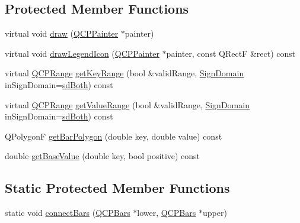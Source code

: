 \subsection*{Protected Member Functions}
\begin{DoxyCompactItemize}
\item 
virtual void \hyperlink{class_q_c_p_bars_a42b894e34dac799f90ff3700706b31df}{draw} (\hyperlink{class_q_c_p_painter}{Q\-C\-P\-Painter} $\ast$painter)
\item 
virtual void \hyperlink{class_q_c_p_bars_ad4fb35d2ab7d2aa460a6612aff3e7a15}{draw\-Legend\-Icon} (\hyperlink{class_q_c_p_painter}{Q\-C\-P\-Painter} $\ast$painter, const Q\-Rect\-F \&rect) const 
\item 
virtual \hyperlink{class_q_c_p_range}{Q\-C\-P\-Range} \hyperlink{class_q_c_p_bars_adbf608df1ba1d28c0bc7a929b18d997b}{get\-Key\-Range} (bool \&valid\-Range, \hyperlink{class_q_c_p_abstract_plottable_a661743478a1d3c09d28ec2711d7653d8}{Sign\-Domain} in\-Sign\-Domain=\hyperlink{class_q_c_p_abstract_plottable_a661743478a1d3c09d28ec2711d7653d8a082b98cfb91a7363a3b5cd17b0c1cd60}{sd\-Both}) const 
\item 
virtual \hyperlink{class_q_c_p_range}{Q\-C\-P\-Range} \hyperlink{class_q_c_p_bars_acbcbf97f591d3b8a130b2fdf0a8af74b}{get\-Value\-Range} (bool \&valid\-Range, \hyperlink{class_q_c_p_abstract_plottable_a661743478a1d3c09d28ec2711d7653d8}{Sign\-Domain} in\-Sign\-Domain=\hyperlink{class_q_c_p_abstract_plottable_a661743478a1d3c09d28ec2711d7653d8a082b98cfb91a7363a3b5cd17b0c1cd60}{sd\-Both}) const 
\item 
Q\-Polygon\-F \hyperlink{class_q_c_p_bars_a1d118a76662cfd691a78c6f573e3f78c}{get\-Bar\-Polygon} (double key, double value) const 
\item 
double \hyperlink{class_q_c_p_bars_ab60a3c4b8e7c59f0f14e25590d96fa4e}{get\-Base\-Value} (double key, bool positive) const 
\end{DoxyCompactItemize}
\subsection*{Static Protected Member Functions}
\begin{DoxyCompactItemize}
\item 
static void \hyperlink{class_q_c_p_bars_a6ea37802cd22f97235cab614b14b9f19}{connect\-Bars} (\hyperlink{class_q_c_p_bars}{Q\-C\-P\-Bars} $\ast$lower, \hyperlink{class_q_c_p_bars}{Q\-C\-P\-Bars} $\ast$upper)
\end{DoxyCompactItemize}
